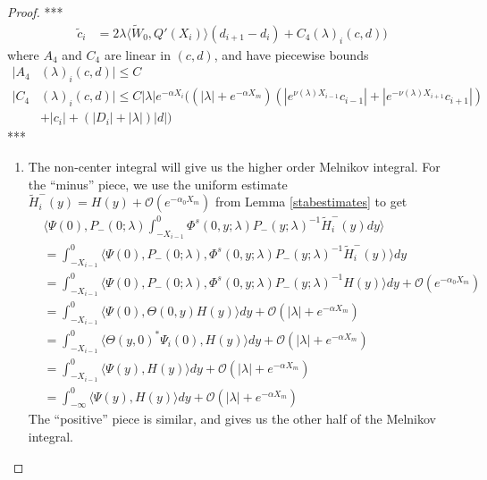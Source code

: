 \documentclass[thesis.tex]{subfiles}
\begin{document}
\begin{lemma}
\begin{proof}
***
\begin{align*}
\tilde{c}_i &= 2 \lambda \langle \tilde{W}_0, Q'(X_i) \rangle (d_{i+1} - d_i ) + C_4(\lambda)_i(c, d) )
\end{align*}
where $A_4$ and $C_4$ are linear in $(c, d)$, and have piecewise bounds
\begin{align}
|A_4&(\lambda)_i(c, d)|
\leq C \label{A4bound} \\
|C_4&(\lambda)_i(c, d)| \leq C |\lambda| e^{-\alpha X_i} \Big( (|\lambda| + e^{-\alpha X_m})(|e^{\nu(\lambda)X_{i-1}} c_{i-1}| + |e^{-\nu(\lambda)X_{i+1}}c_{i+1}|) \nonumber \\
&+ |c_i| + (|D_i| + |\lambda|)|d| \Big) \label{C4bound}
\end{align}
***

\begin{enumerate}
\item The non-center integral will give us the higher order Melnikov integral. For the ``minus'' piece, we use the uniform estimate $\tilde{H}_i^-(y) = H(y) + \mathcal{O}(e^{-\alpha_0 X_m})$ from Lemma \ref{stabestimates} to get
\begin{align*}
&\langle \Psi(0), P_-(0; \lambda) \int_{-X_{i-1}}^0 \Phi^s(0, y; \lambda) P_-(y; \lambda)^{-1} \tilde{H}_i^-(y) dy \rangle \\
&= \int_{-X_{i-1}}^0 \langle \Psi(0), P_-(0; \lambda), \Phi^s(0, y; \lambda) P_-(y; \lambda)^{-1} \tilde{H}_i^-(y) \rangle dy \\
&= \int_{-X_{i-1}}^0 \langle \Psi(0), P_-(0; \lambda), \Phi^s(0, y; \lambda) P_-(y; \lambda)^{-1} H(y) \rangle dy + \mathcal{O}({e^{-\alpha_0 X_m}})\\
&= \int_{-X_{i-1}}^0 \langle \Psi(0), \Theta(0, y) H(y) \rangle dy + \mathcal{O}(|\lambda| + {e^{-\alpha X_m}})\\
&= \int_{-X_{i-1}}^0 \langle \Theta(y, 0)^* \Psi_i(0), H(y) \rangle dy + \mathcal{O}(|\lambda| + {e^{-\alpha X_m}})\\
&= \int_{-X_{i-1}}^0 \langle \Psi(y), H(y) \rangle dy + \mathcal{O}(|\lambda| + {e^{-\alpha X_m}})\\
&= \int_{-\infty}^0 \langle \Psi(y), H(y) \rangle dy + \mathcal{O}(|\lambda| + {e^{-\alpha X_m}})
\end{align*}
The ``positive'' piece is similar, and gives us the other half of the Melnikov integral.


\end{enumerate}
\end{proof}
\end{lemma}
\end{document}
